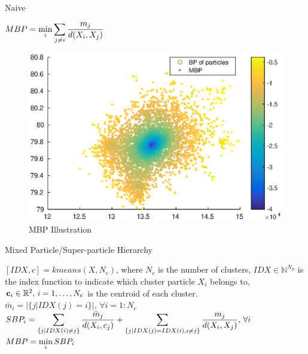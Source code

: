 \documentclass[10pt]{article}
\begin{document}
 \begin{algorithm}
\caption{Naive}
\label{naive}
\begin{algorithmic}[1]
  \State $\displaystyle MBP=\min_i \displaystyle\sum_{j\neq i}\frac{m_j}{d(X_i,X_j)}$
\end{algorithmic} 
 \end{algorithm}
\begin{figure}[H]
\centering
\includegraphics[scale=0.45]{naive}%
\caption{MBP Illustration}
\label{fig:naive}
\end{figure}
 \begin{algorithm}
\caption{Mixed Particle/Super-particle Hierarchy}
\label{sp-mixed}
\begin{algorithmic}[1]
\State $[IDX,c]=kmeans(X,N_c)$, where $N_c$ is  the number of clusters, $IDX\in \mathbb{N}^{N_p}$ is the index function to indicate which cluster particle $X_i$ belongs to, ${\bf c} _i \in \mathbb{R}^{2}, \, i=1,\dots,N_c$ is the centroid of each cluster. 
\State $\bar m_i=|\{j | IDX(j)=i\}|,\,\forall i=1:N_c$
\State $SBP_i=\displaystyle\sum_{\{j|IDX(i)\neq j\}}\frac{\bar m_j}{d(X_i,c_j)}+\displaystyle\sum_{\{j|IDX(j)=IDX(i),i\neq j\}}\frac{m_j}{d(X_i,X_j)},\, \forall i$ 
\State $MBP=\displaystyle\min_i SBP_i$
\EndProcedure
\end{algorithmic} 
 \end{algorithm}
\end{document}
